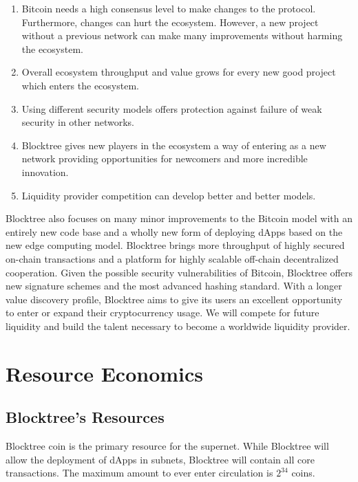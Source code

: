 \documentclass[12pt]{article}
\begin{document}
\begin{enumerate}

\item Bitcoin needs a high consensus level to make changes to the protocol. Furthermore, changes can hurt the ecosystem. However, a new project without a previous network can make many improvements without harming the ecosystem.

\item Overall ecosystem throughput and value grows for every new good project which enters the ecosystem. 

\item Using different security models offers protection against failure of weak security in other networks. 

\item Blocktree gives new players in the ecosystem a way of entering as a new network providing opportunities for newcomers and more incredible innovation. 

\item Liquidity provider competition can develop better and better models.

\end{enumerate}

Blocktree also focuses on many minor improvements to the Bitcoin model with an entirely new code base and a wholly new form of deploying dApps based on the new edge computing model. Blocktree brings more throughput of highly secured on-chain transactions and a platform for highly scalable off-chain decentralized cooperation. Given the possible security vulnerabilities of Bitcoin, Blocktree offers new signature schemes and the most advanced hashing standard. With a longer value discovery profile, Blocktree aims to give its users an excellent opportunity to enter or expand their cryptocurrency usage. We will compete for future liquidity and build the talent necessary to become a worldwide liquidity provider.





\section{Resource Economics}

\subsection{Blocktree's Resources}

Blocktree coin is the primary resource for the supernet. While Blocktree will allow the deployment of dApps in subnets, Blocktree will contain all core transactions. The maximum amount to ever enter circulation is $2^{34}$ coins.
\end{document}
